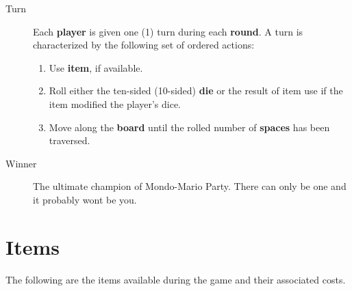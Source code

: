 \documentclass{article}
\begin{document}
\begin{description}
\item[Turn] Each \textbf{player} is given one (1) turn during each \textbf{round}.
A turn is characterized by the following set of ordered actions:
\begin{enumerate}
\item Use \textbf{item}, if available.
\item Roll either the ten-sided (10-sided) \textbf{die} or the result of
item use if the item modified the player's dice.
\item Move along the \textbf{board} until the rolled number of \textbf{spaces}
has been traversed.
\end{enumerate}

\item[Winner] The ultimate champion of Mondo-Mario Party.  There can only be one
and it probably wont be you.

\end{description}

\section{Items}

The following are the items available during the game and their associated
costs.
\end{document}
